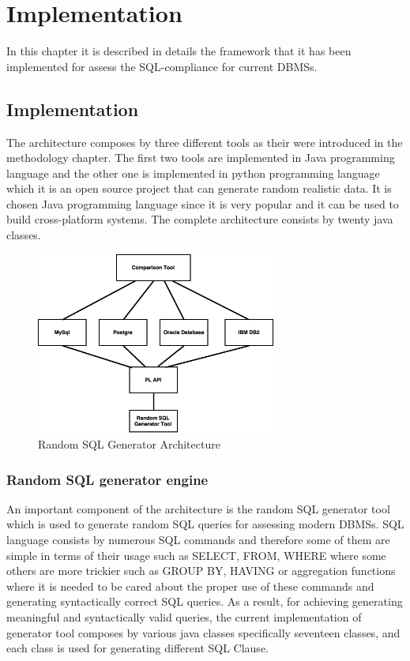 \chapter{Implementation}
In this chapter it is described in details the framework that it has been implemented for assess the SQL-compliance for current DBMSs.

\section{Implementation}
The architecture composes by three different tools as their were introduced in the methodology chapter. The first two tools are implemented in Java programming language and the other one is implemented in python programming language which it is an open source project that can generate random realistic data.  It is chosen Java programming language since it is very popular and it can be used to build cross-platform systems. The complete architecture consists by twenty java classes. 

 \begin{figure} 
      \centering
      \includegraphics[width=\textwidth,height=6cm]{Images/Chapter4/1-implemen_detail}
      \caption{Random SQL Generator Architecture}
      \label{fig:counting-methods}
  \end{figure}

\subsection{Random SQL generator engine}
An important component of the architecture is the random SQL generator tool which is used to generate random SQL queries for assessing modern DBMSs. SQL language consists by numerous SQL commands and therefore some of them are simple in terms of their usage such as SELECT, FROM, WHERE where some others are more trickier such as GROUP BY, HAVING or aggregation functions where it is needed to be cared about the proper use of these commands and generating syntactically correct SQL queries. As a result, for achieving generating meaningful and syntactically valid queries, the current implementation of generator tool composes by various java classes specifically seventeen classes, and each class is used for generating different SQL Clause. 

